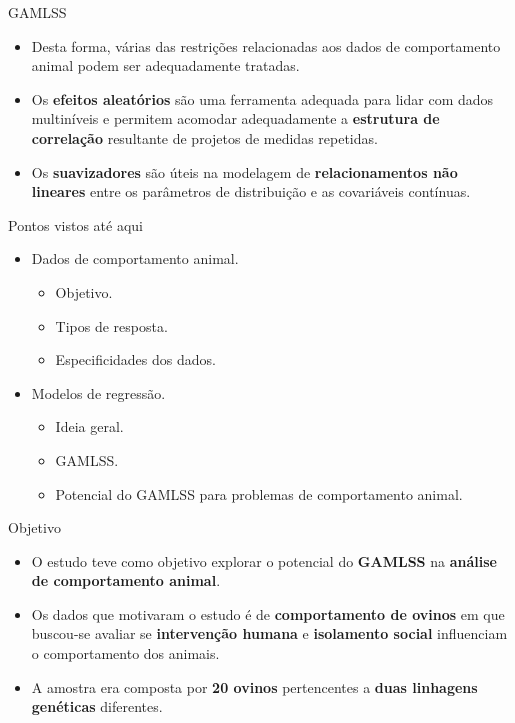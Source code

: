 \documentclass[
  ignorenonframetext,
  serif,
  professionalfont,
  usenames,
  dvipsnames,
  aspectratio = 169]{beamer}
\providecommand{\tightlist}{%
  \setlength{\itemsep}{0pt}\setlength{\parskip}{0pt}}
\renewcommand{\tightlist}{%
  \setlength{\itemsep}{0\baselineskip}
  \setlength{\parskip}{0.25\baselineskip}
}
\def\beginAHalfColumn{\begin{minipage}{0.49\textwidth}}%
\def\endColumns{\end{minipage}}%
\begin{document}
\begin{frame}{GAMLSS}
\protect\hypertarget{gamlss-1}{}
\begin{itemize}
\item
  Desta forma, várias das restrições relacionadas aos dados de
  comportamento animal podem ser adequadamente tratadas.
\item
  Os \textbf{efeitos aleatórios} são uma ferramenta adequada para lidar
  com dados multiníveis e permitem acomodar adequadamente a
  \textbf{estrutura de correlação} resultante de projetos de medidas
  repetidas.
\item
  Os \textbf{suavizadores} são úteis na modelagem de
  \textbf{relacionamentos não lineares} entre os parâmetros de
  distribuição e as covariáveis contínuas.
\end{itemize}
\end{frame}

\begin{frame}{Pontos vistos até aqui}
\protect\hypertarget{pontos-vistos-atuxe9-aqui}{}
\beginAHalfColumn

\begin{itemize}
\tightlist
\item
  Dados de comportamento animal.

  \begin{itemize}
  \tightlist
  \item
    Objetivo.
  \item
    Tipos de resposta.
  \item
    Especificidades dos dados.
  \end{itemize}
\item
  Modelos de regressão.

  \begin{itemize}
  \tightlist
  \item
    Ideia geral.
  \item
    GAMLSS.
  \item
    Potencial do GAMLSS para problemas de comportamento animal.
  \end{itemize}
\end{itemize}

\endColumns
\beginAHalfColumn

\endColumns
\end{frame}

\begin{frame}{Objetivo}
\protect\hypertarget{objetivo}{}
\begin{itemize}
\item
  O estudo teve como objetivo explorar o potencial do \textbf{GAMLSS} na
  \textbf{análise de comportamento animal}.
\item
  Os dados que motivaram o estudo é de \textbf{comportamento de ovinos}
  em que buscou-se avaliar se \textbf{intervenção humana} e
  \textbf{isolamento social} influenciam o comportamento dos animais.
\item
  A amostra era composta por \textbf{20 ovinos} pertencentes a
  \textbf{duas linhagens genéticas} diferentes.
\end{itemize}
\end{frame}
\end{document}
